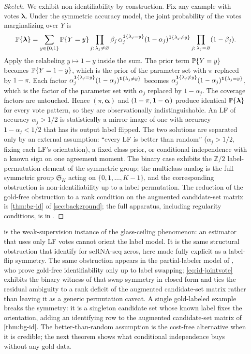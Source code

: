 \begin{proof}[Sketch]
We exhibit non-identifiability by construction. Fix any example with
votes $\bm{\lambda}$. Under the symmetric accuracy model, the joint
probability of the votes marginalizing over $Y$ is
\begin{equation}
  \mathbb{P}\{\bm{\lambda}\}
  = \sum_{y \in \{0,1\}} \mathbb{P}\{Y = y\}
    \prod_{j:\,\lambda_j \neq \varnothing}
    \beta_j\, \alpha_j^{\mathbf{1}\{\lambda_j = y\}}
    (1-\alpha_j)^{\mathbf{1}\{\lambda_j \neq y\}}
    \prod_{j:\,\lambda_j = \varnothing} (1 - \beta_j).
  \label{eq:id-jointvote}
\end{equation}
Apply the relabeling $y \mapsto 1 - y$ inside the sum. The prior term
$\mathbb{P}\{Y = y\}$ becomes $\mathbb{P}\{Y = 1 - y\}$, which is the prior of
the parameter set with $\pi$ replaced by $1 - \pi$. Each factor
$\alpha_j^{\mathbf{1}\{\lambda_j = y\}}(1-\alpha_j)^{\mathbf{1}\{\lambda_j \neq y\}}$
becomes $\alpha_j^{\mathbf{1}\{\lambda_j \neq y\}}(1-\alpha_j)^{\mathbf{1}\{\lambda_j
= y\}}$, which is the factor of the parameter set with $\alpha_j$
replaced by $1 - \alpha_j$. The coverage factors are untouched. Hence
$(\pi, \bm{\alpha})$ and $(1 - \pi, \mathbf{1} - \bm{\alpha})$ produce
identical $\mathbb{P}\{\bm{\lambda}\}$ for every vote pattern, so they are
observationally indistinguishable. An LF of accuracy $\alpha_j > 1/2$
is statistically a mirror image of one with accuracy $1 - \alpha_j <
1/2$ that has its output label flipped. The two solutions are
separated only by an external assumption: ``every LF is better than
random'' ($\alpha_j > 1/2$, fixing each LF's orientation), a fixed
class prior, or conditional independence with a known sign on one
agreement moment. The binary case exhibits the $\mathbb{Z}/2$
label-permutation element of the symmetric group; the multiclass
analog is the full symmetric group $\mathfrak{S}_K$ acting on
$\{0, 1, \ldots, K-1\}$, and the corresponding obstruction is
non-identifiability up to a label permutation. The reduction of the
gold-free obstruction to a rank condition on the augmented
candidate-set matrix is \cref{thm:bg-id} of \cref{sec:background};
the full apparatus, including regularity conditions, is in
\citet{towell2026masked}.
\end{proof}

 is the weak-supervision instance of the
glass-ceiling phenomenon: an estimator that uses only LF votes cannot
orient the label model. It is the same structural obstruction that
\citet{towell2026scrnacoarsening} identify for scRNA-seq zeros, here
made fully explicit as a label-flip symmetry. The same obstruction
appears in the partial-labeler model of \citet{yu2022nplm}, who prove
gold-free identifiability only up to label swapping; \cref{eq:id-jointvote}
exhibits the binary witness of that swap symmetry in closed form and
ties the residual ambiguity to a rank deficit of the augmented
candidate-set matrix rather than leaving it as a generic permutation
caveat. A single gold-labeled example breaks the symmetry: it is a
singleton candidate set whose known label fixes the orientation,
adding an identifying row to the augmented candidate-set matrix of
\cref{thm:bg-id}. The
better-than-random assumption is the cost-free alternative when it is
credible; the next theorem shows what conditional independence buys
without any gold data.

